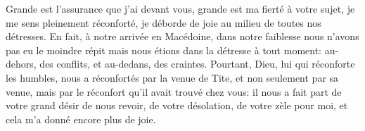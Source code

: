 Grande est l’assurance que j’ai devant vous,
	grande est ma fierté à votre sujet,
	je me sens pleinement réconforté,
	je déborde de joie au milieu de toutes nos détresses.
En fait, à notre arrivée en Macédoine,
	dans notre faiblesse nous n’avons pas eu le moindre répit
	mais nous étions dans la détresse à tout moment:
	au-dehors, des conflits, et au-dedans, des craintes.
Pourtant, Dieu, lui qui réconforte les humbles,
	nous a réconfortés par la venue de Tite,
	et non seulement par sa venue,
		mais par le réconfort qu’il avait trouvé chez vous:
	il nous a fait part de votre grand désir de nous revoir,
	de votre désolation, de votre zèle pour moi,
	et cela m’a donné encore plus de joie.
